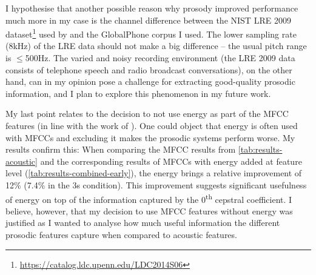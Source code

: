 \documentclass[bsc,frontabs,twoside,singlespacing,parskip,deptreport]{infthesis}
\begin{document}
{{    I hypothesise that another possible reason why prosody improved performance much more in my case is the channel difference between the NIST LRE 2009 dataset\footnote{\url{https://catalog.ldc.upenn.edu/LDC2014S06}} used by \citeauthor{Martinez_et_al_2012} and the GlobalPhone corpus I used. The lower sampling rate (8kHz) of the LRE data should not make a big difference -- the usual pitch range is $\leq$500Hz. The varied and noisy recording environment (the LRE 2009 data consists of telephone speech and radio broadcast conversations), on the other hand, can in my opinion pose a challenge for extracting good-quality prosodic information, and I plan to explore this phenomenon in my future work.

    My last point relates to the decision to not use energy as part of the MFCC features (in line with the work of \citet{Snyder_et_al_2018}). One could object that energy is often used with MFCCs and excluding it makes the prosodic systems perform worse. My results confirm this: When comparing the MFCC results from \autoref{tab:results-acoustic} and the corresponding results of MFCCs with energy added at feature level (\autoref{tab:results-combined-early}), the energy brings a relative improvement of 12\% (7.4\% in the 3s condition). This improvement suggests significant usefulness of energy on top of the information captured by the 0\textsuperscript{th} cepstral coefficient. I believe, however, that my decision to use MFCC features without energy was justified as I wanted to analyse how much useful information the different prosodic features capture when compared to acoustic features.
  }
}
\end{document}
